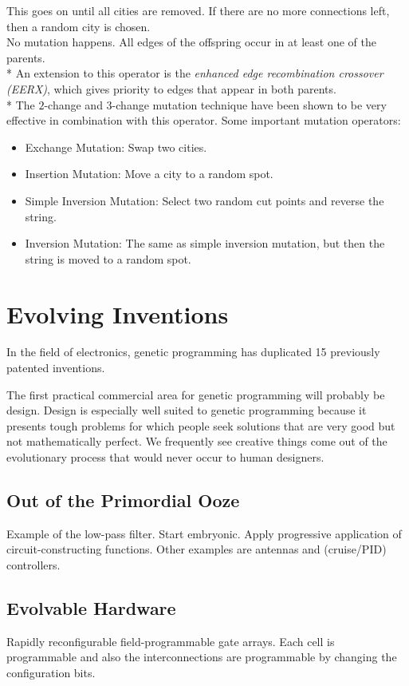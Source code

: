 \documentclass[12pt]{article}
\begin{document}
\begin{itemize}
\begin{itemize}
\end{itemize}
This goes on until all cities are removed. If there are no more connections left, then a random city is chosen.\\
No mutation happens. All edges of the offspring occur in at least one of the parents.\\*
An extension to this operator is the \textit{enhanced edge recombination crossover (EERX)}, which gives priority to edges that appear in both parents.\\*
The $2$-change and $3$-change mutation technique have been shown to be very effective in combination with this operator. Some important mutation operators:
\begin{itemize}
\item Exchange Mutation: Swap two cities.
\item Insertion Mutation: Move a city to a random spot.
\item Simple Inversion Mutation: Select two random cut points and reverse the string.
\item Inversion Mutation: The same as simple inversion mutation, but then the string is moved to a random spot.
\end{itemize}
\end{itemize}
\clearpage

\appendix
\section{Evolving Inventions}
In the field of electronics, genetic programming has duplicated 15 previously patented inventions.

The first practical commercial area for genetic programming will probably be design. Design is especially well suited to genetic programming because it presents tough problems for which people seek solutions that are very good but not mathematically perfect. We frequently see creative things come out of the evolutionary process that would never occur to human designers.

\subsection{Out of the Primordial Ooze}
Example of the low-pass filter. Start embryonic. Apply progressive application of circuit-constructing functions. Other examples are antennas and (cruise/PID) controllers.

\subsection{Evolvable Hardware}
Rapidly reconfigurable field-programmable gate arrays. Each cell is programmable and also the interconnections are programmable by changing the configuration bits.
\end{document}
